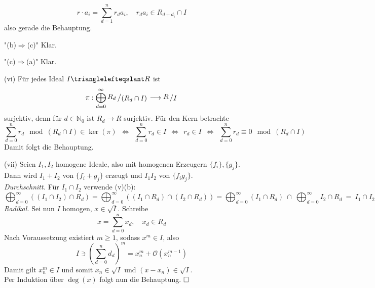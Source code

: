 \documentclass[11pt]{book}
\theoremstyle{nonumberbreak}
\newenvironment{pr}[1][]{\ifthenelse{\equal{#1}{}}{\proof}{\proof[#1]}\rm}{\endproof}
\newenvironment{definbem}[1][]{\ifthenelse{\equal{#1}{}}{\definibem}{\definibem[#1]}\rm}{\enddefinibem}
\newcommand{\slant}[2]{{\raisebox{.1em}{$#1$}\left/\raisebox{-.1em}{$#2$}\right.}}
\begin{document}
\begin{spacing}{1.3}
\begin{definbem}
\begin{pr}
\begin{compactenum}
\begin{compactenum}
\begin{compactenum}
$$r\cdot a_i = \sum_{d=1}^n r_d a_i, \quad r_da_i \in R_{d+d_i} \cap I$$
also gerade die Behauptung.
\end{compactenum}
\item["(b)$\Rightarrow$(c)"] Klar.
\item["(c)$\Rightarrow$(a)"] Klar.
\end{compactenum}
\item[(vi)] Für jedes Ideal $I \trianglelefteqslant R$ ist 
$$\pi: \bigoplus_{d=0}^{\infty} \slant{R_d}{(R_d \cap I)} \longrightarrow \slant{R}{I}$$
surjektiv, denn für $d \in \mathbb{N}_0$ ist $R_d \longrightarrow R$ surjektiv. Für den Kern betrachte
$$\sum_{d=0}^n r_d \mod (R_d \cap I) \in \ker(\pi) \ \ \Longleftrightarrow \ \ \sum_{d=0}^n r_d \in I \ \ \Longleftrightarrow \ \ r_d \in I \ \ \Longleftrightarrow \ \ \sum_{d=0}^n r_d \equiv 0 \mod (R_d \cap I)$$
Damit folgt die Behauptung.
\item[(vii)] Seien $I_1, I_2$ homogene Ideale, also mit homogenen Erzeugern $\{f_i\}, \{g_j\}$.\\
Dann wird $I_1 + I_2$ von $\{f_i + g_j\}$ erzeugt und $I_1 I_2$ von $\{f_i g_j\}$.\\
\textit{Durchschnitt.} Für $I_1 \cap I_2$ verwende (v)(b):
$$\bigoplus_{d=0}^{\infty} ((I_1 \cap I_2) \cap R_d) = \bigoplus_{d=0}^{\infty} \left(( I_1 \cap R_d) \cap (I_2 \cap R_d)\right) = \bigoplus_{d=0}^{\infty} (I_1 \cap R_d)\ \cap\ \bigoplus_{d=0}^{\infty} I_2 \cap R_d \ = \ I_1 \cap I_2$$
\textit{Radikal.} Sei nun $I$ homogen, $x \in \sqrt{I}$. Schreibe
$$x= \sum_{d=0}^n x_d, \quad x_d \in R_d$$
Nach Voraussetzung existiert $m \geqslant 1$, sodass $x^m \in I$, also
$$I \ni \left(\sum_{d=0}^n d_d \right)^m = x_n^m + \mathcal{O}(x_n^{m-1})$$
Damit gilt $x_n^m \in I$ und somit $x_n \in \sqrt{I}$ und $(x-x_n) \in \sqrt{I}$.\\
Per Induktion über $\deg(x)$ folgt nun die Behauptung. $\hfill \Box$
\end{compactenum}
\end{pr}
\end{definbem}


\end{spacing}
\end{document}
